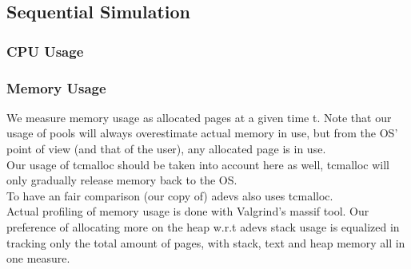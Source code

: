 \subsection{Sequential Simulation}
\subsubsection{CPU Usage}


\subsubsection{Memory Usage}
We measure memory usage as allocated pages at a given time t. Note that our usage of pools will always overestimate actual memory in use, but from the OS' point of view (and that of the user), any allocated page is in use.\\
Our usage of tcmalloc should be taken into account here as well, tcmalloc will only gradually release memory back to the OS. \\
To have an fair comparison (our copy of) adevs also uses tcmalloc.\\
Actual profiling of memory usage is done with Valgrind's \cite{Nethercote:2007:VFH:1273442.1250746} massif tool. Our preference of allocating more on the heap w.r.t adevs stack usage is equalized %
in tracking only the total amount of pages, with stack, text and heap memory all  in one measure. 

